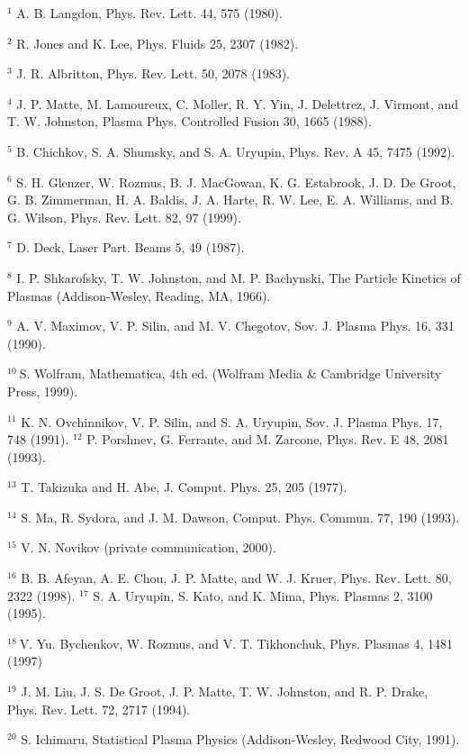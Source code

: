 \documentclass[10pt]{article}
\begin{document}
${ }^{1}$ A. B. Langdon, Phys. Rev. Lett. 44, 575 (1980).

${ }^{2}$ R. Jones and K. Lee, Phys. Fluids 25, 2307 (1982).

${ }^{3}$ J. R. Albritton, Phys. Rev. Lett. 50, 2078 (1983).

${ }^{4}$ J. P. Matte, M. Lamoureux, C. Moller, R. Y. Yin, J. Delettrez, J. Virmont, and T. W. Johnston, Plasma Phys. Controlled Fusion 30, 1665 (1988).

${ }^{5}$ B. Chichkov, S. A. Shumsky, and S. A. Uryupin, Phys. Rev. A 45, 7475 (1992).

${ }^{6}$ S. H. Glenzer, W. Rozmus, B. J. MacGowan, K. G. Estabrook, J. D. De Groot, G. B. Zimmerman, H. A. Baldis, J. A. Harte, R. W. Lee, E. A. Williams, and B. G. Wilson, Phys. Rev. Lett. 82, 97 (1999).

${ }^{7}$ D. Deck, Laser Part. Beams 5, 49 (1987).

${ }^{8}$ I. P. Shkarofsky, T. W. Johnston, and M. P. Bachynski, The Particle Kinetics of Plasmas (Addison-Wesley, Reading, MA, 1966).

${ }^{9}$ A. V. Maximov, V. P. Silin, and M. V. Chegotov, Sov. J. Plasma Phys. 16, 331 (1990).

${ }^{10} \mathrm{~S}$. Wolfram, Mathematica, 4th ed. (Wolfram Media \& Cambridge University Press, 1999).

${ }^{11}$ K. N. Ovchinnikov, V. P. Silin, and S. A. Uryupin, Sov. J. Plasma Phys. 17, 748 (1991). ${ }^{12}$ P. Porshnev, G. Ferrante, and M. Zarcone, Phys. Rev. E 48, 2081 (1993).

${ }^{13}$ T. Takizuka and H. Abe, J. Comput. Phys. 25, 205 (1977).

${ }^{14}$ S. Ma, R. Sydora, and J. M. Dawson, Comput. Phys. Commun. 77, 190 (1993).

${ }^{15}$ V. N. Novikov (private communication, 2000).

${ }^{16}$ B. B. Afeyan, A. E. Chou, J. P. Matte, and W. J. Kruer, Phys. Rev. Lett. 80, 2322 (1998). ${ }^{17}$ S. A. Uryupin, S. Kato, and K. Mima, Phys. Plasmas 2, 3100 (1995).

${ }^{18} \mathrm{~V}$. Yu. Bychenkov, W. Rozmus, and V. T. Tikhonchuk, Phys. Plasmas 4, 1481 (1997)

${ }^{19}$ J. M. Liu, J. S. De Groot, J. P. Matte, T. W. Johnston, and R. P. Drake, Phys. Rev. Lett. 72, 2717 (1994).

${ }^{20}$ S. Ichimaru, Statistical Plasma Physics (Addison-Wesley, Redwood City, 1991).
\end{document}
